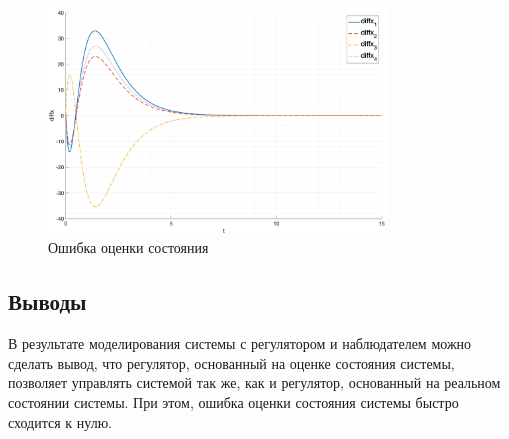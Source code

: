 \begin{figure}[ht!]
    \centering
    \includegraphics[width=0.8\textwidth]{media/plots/task3_diffx_1.png}
    \caption{Ошибка оценки состояния}
    \label{fig:task3_diff}
\end{figure}

\FloatBarrier
\subsection{Выводы}
В результате моделирования системы с регулятором и наблюдателем можно сделать вывод, что регулятор, основанный 
на оценке состояния системы, позволяет управлять системой так же, как и регулятор, основанный на реальном
состоянии системы. При этом, ошибка оценки состояния системы быстро сходится к нулю. 